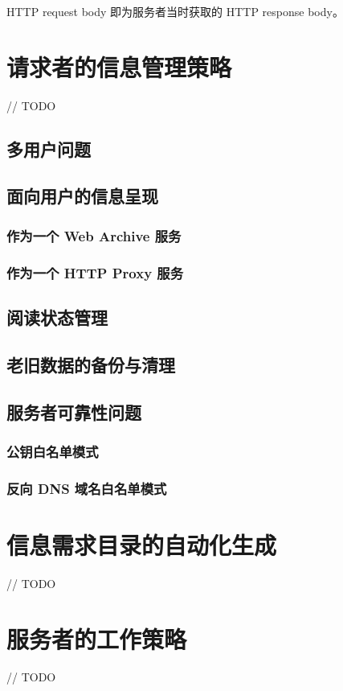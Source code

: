 \documentclass[a4paper,11pt]{article}
\begin{document}
HTTP request body 即为服务者当时获取的 HTTP response body。




\section{请求者的信息管理策略}
// TODO

\subsection{多用户问题}
\subsection{面向用户的信息呈现}
\subsubsection{作为一个 Web Archive 服务}
\subsubsection{作为一个 HTTP Proxy 服务}
\subsection{阅读状态管理}
\subsection{老旧数据的备份与清理}
\subsection{服务者可靠性问题}
\subsubsection{公钥白名单模式}
\subsubsection{反向 DNS 域名白名单模式}

\section{信息需求目录的自动化生成}
// TODO

\section{服务者的工作策略}
// TODO
\end{document}
